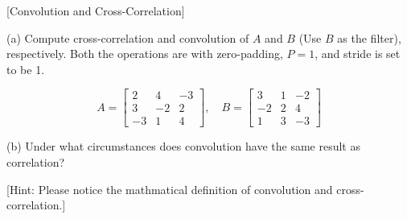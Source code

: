 \item {} [Convolution and Cross-Correlation]

(a) Compute cross-correlation and convolution of $A$ and $B$ (Use $B$ as the filter), respectively. Both the operations are with zero-padding, $P=1$, and stride is set to be 1. 

$$
A=\left[\begin{array}{ccc}
2 & 4 & -3 \\
3 & -2 & 2 \\
-3 & 1 & 4
\end{array}\right], \quad B=\left[\begin{array}{ccc}
3 & 1 & -2 \\
-2 & 2 & 4 \\
1 & 3 & -3
\end{array}\right]
$$

(b) Under what circumstances does convolution have the same result as correlation? 

[Hint: Please notice the mathmatical definition of convolution and cross-correlation.]

\solution











\newpage